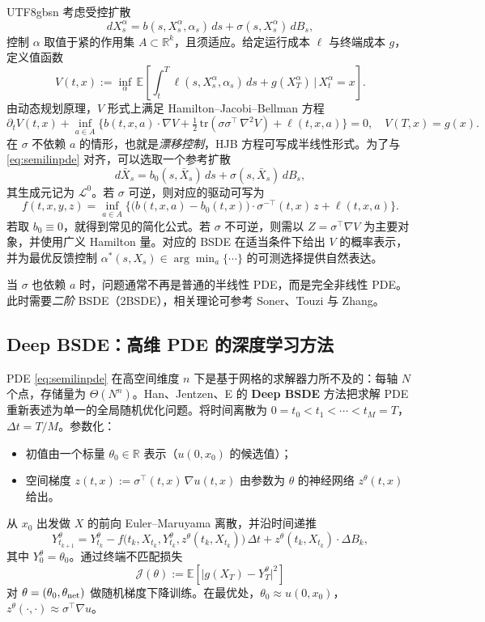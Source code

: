 \documentclass{article}
\theoremstyle{plain}
\theoremstyle{definition}
\theoremstyle{remark}
\newcommand{\E}{\mathbb{E}}
\newcommand{\R}{\mathbb{R}}
\newcommand{\Lc}{\mathcal{L}}
\begin{document}
\begin{CJK*}{UTF8}{gbsn}
考虑受控扩散
\[
  dX^\alpha_s = b(s, X^\alpha_s, \alpha_s)\, ds + \sigma(s, X^\alpha_s)\, dB_s,
\]
控制 $\alpha$ 取值于紧的作用集 $A \subset \R^k$，且须适应。给定运行成本 $\ell$ 与终端成本 $g$，定义值函数
\[
  V(t, x) := \inf_{\alpha}\, \E\!\left[ \int_t^T \ell(s, X^\alpha_s, \alpha_s)\,ds + g(X^\alpha_T) \,\bigg|\, X^\alpha_t = x \right].
\]
由动态规划原理，$V$ 形式上满足 Hamilton--Jacobi--Bellman 方程
\[
  \partial_t V(t, x) + \inf_{a \in A}\Big\{ b(t, x, a) \cdot \nabla V + \tfrac12\, \mathrm{tr}(\sigma \sigma^{\top}\, \nabla^2 V) + \ell(t, x, a) \Big\} = 0, \quad V(T, x) = g(x).
\]
在 $\sigma$ 不依赖 $a$ 的情形，也就是\emph{漂移控制}，HJB 方程可写成半线性形式。为了与 \eqref{eq:semilinpde} 对齐，可以选取一个参考扩散
\[
  d\bar X_s = b_0(s, \bar X_s)\,ds + \sigma(s, \bar X_s)\,dB_s,
\]
其生成元记为 $\Lc^0$。若 $\sigma$ 可逆，则对应的驱动可写为
\[
  f(t, x, y, z) = \inf_{a \in A}\!\Big\{ \big(b(t, x, a) - b_0(t,x)\big) \cdot \sigma^{-\top}(t, x)\, z + \ell(t, x, a) \Big\}.
\]
若取 $b_0 \equiv 0$，就得到常见的简化公式。若 $\sigma$ 不可逆，则需以 $Z = \sigma^{\top} \nabla V$ 为主要对象，并使用广义 Hamilton 量。对应的 BSDE 在适当条件下给出 $V$ 的概率表示，并为最优反馈控制 $\alpha^*(s, X_s) \in \arg\min_a \{\cdots\}$ 的可测选择提供自然表达。

当 $\sigma$ 也依赖 $a$ 时，问题通常不再是普通的半线性 PDE，而是完全非线性 PDE。此时需要\emph{二阶} BSDE（2BSDE），相关理论可参考 Soner、Touzi 与 Zhang。

\subsection{Deep BSDE：高维 PDE 的深度学习方法}

PDE \eqref{eq:semilinpde} 在高空间维度 $n$ 下是基于网格的求解器力所不及的：每轴 $N$ 个点，存储量为 $\Theta(N^n)$。Han、Jentzen、E 的 \textbf{Deep BSDE} 方法\cite{han-jentzen-e}把求解 PDE 重新表述为单一的全局随机优化问题。将时间离散为 $0 = t_0 < t_1 < \cdots < t_M = T$，$\Delta t = T/M$。参数化：
\begin{itemize}
  \item 初值由一个标量 $\theta_0 \in \R$ 表示（$u(0, x_0)$ 的候选值）；
  \item 空间梯度 $z(t, x) := \sigma^{\top}(t, x)\,\nabla u(t, x)$ 由参数为 $\theta$ 的神经网络 $z^\theta(t, x)$ 给出。
\end{itemize}
从 $x_0$ 出发做 $X$ 的前向 Euler--Maruyama 离散，并沿时间递推
\[
  Y^\theta_{t_{k+1}} = Y^\theta_{t_k} - f\!\big(t_k, X_{t_k}, Y^\theta_{t_k}, z^\theta(t_k, X_{t_k})\big)\, \Delta t + z^\theta(t_k, X_{t_k}) \cdot \Delta B_k,
\]
其中 $Y^\theta_0 = \theta_0$。通过终端不匹配损失
\[
  \mathcal{J}(\theta) := \E\!\left[ \big| g(X_T) - Y^\theta_T \big|^2 \right]
\]
对 $\theta = (\theta_0, \theta_{\rm net})$ 做随机梯度下降训练。在最优处，$\theta_0 \approx u(0, x_0)$，$z^\theta(\cdot, \cdot) \approx \sigma^{\top} \nabla u$。


\end{CJK*}
\end{document}
